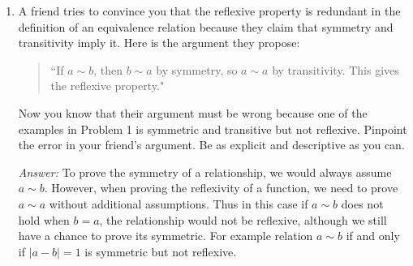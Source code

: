\documentclass[11pt,a4paper]{article}
\newcommand{\Z}{\mathbb{Z}}
\begin{document}
\begin{enumerate}
	(Note: This is a set theoretic construction of the set of rational numbers \(\mathbb{Q}\) from the set of integers \(\Z\). The rational number \(\frac{a}{b}\) is defined to be the equivalence class containing the pair \((a,b)\).)

	\begin{proof}
		\begin{itemize}
			\item Reflexivity: Take $(a,b)$ in $S,$ and clearly $(a,b)\sim (a,b)$ holds, as $ab-ab=0$ for all $a$s and $b$s. Hence $\sim$ is reflexive.
			\item Symmetry: Take $(a,b), (c,d)$ in $S.$ If $(a,b) \sim (c,d),$ then $ad-bc = 0 = bc-ad$. Thus $(c,d) \sim (a,b).$ Hence $\sim$ is symmetric.
			\item Transitivity: Take $(a,b), (c,d), (e,f)$ in $S$ so that $(a,b)\sim (c,d), (c,d)\sim (e,f).$ We then have $ad-bc = cf-de = 0.$ Since $ad = bc, ad(ef) = bc(ef) = af(de) = eb(cd).$ Also because $cf=de, af(de) = eb(cd) = eb(de).$ $af(de) = eb(de).$ If $e \ne 0, af = eb, af - eb = 0.$ The relation holds for $(a,b), (e,f)$. If $e=0$, then since $cf-de = 0, cf = 0.$ By definition $f$ cannot be zero thus in this case $c=0.$ Since we also have $ad-bc=0, ad=0.$ Similarly, $a=0$ as $d$ cannot be zero. Since $a=e=0,$ $af-eb=0.$ The relation holds for $(a,b), (e,f)$ in this case as well. Thus $\sim$ is transitive.
		\end{itemize}
		By checking relation $\sim$ is reflexive, symmetric and transitive, we have proven that it is an equivalence relation.
	\end{proof}

	\item A friend tries to convince you that the reflexive property is redundant in the definition of an equivalence relation because they claim that symmetry and transitivity imply it.  Here is the argument they propose:

	\begin{quote}
		``If \(a \sim b\), then \(b \sim a\) by symmetry, so \(a \sim a\) by transitivity.  This gives the reflexive property."
	\end{quote}

	Now you know that their argument must be wrong because one of the examples in Problem 1 is symmetric and transitive but not reflexive.  Pinpoint the error in your friend's argument. Be as explicit and descriptive as you can.

	\emph{Answer:} To prove the symmetry of a relationship, we would always assume $a \sim b$. However, when proving the reflexivity of a function, we need to prove $a \sim a$ without additional assumptions. Thus in this case if $a \sim b$ does not hold when $b = a$, the relationship would not be reflexive, although we still have a chance to prove its symmetric. For example relation $a \sim b$ if and only if $\mid a - b \mid = 1$ is symmetric but not reflexive.


\end{enumerate}
\end{document}
